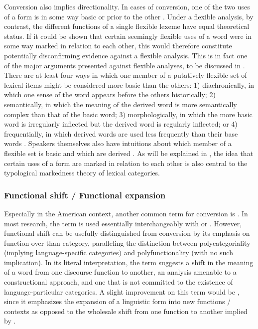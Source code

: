 Conversion also implies directionality. In cases of conversion, one of the two uses of a form is in some way basic or prior to the other \parencites[156]{Mithun2017}[5]{VapnarskyVeneziano2017a}. Under a flexible analysis, by contrast, the different functions of a single flexible lexeme have equal theoretical status. If it could be shown that certain seemingly flexible uses of a word were in some way marked in relation to each other, this would therefore constitute potentially disconfirming evidence against a flexible analysis. This is in fact one of the major arguments presented against flexible analyses, to be discussed in . There are at least four ways in which one member of a putatively flexible set of lexical items might be considered more basic than the others: 1) diachronically, in which one sense of the word appears before the others historically; 2) semantically, in which the meaning of the derived word is more semantically complex than that of the basic word; 3) morphologically, in which the more basic word is irregularly inflected but the derived word is regularly inflected; or 4) frequentially, in which derived words are used less frequently than their base words \parencite[108--111]{Plag2003}. Speakers themselves also have intuitions about which member of a flexible set is basic and which are derived \parencite[166]{Mithun2017}. As will be explained in , the idea that certain uses of a form are marked in relation to each other is also central to the typological markedness theory of lexical categories.

\subsubsection{Functional shift / Functional expansion}
\label{sec:2.3.1.8}

Especially in the American context, another common term for conversion is  \parencite{Cannon1985}. In most research, the term is used essentially interchangeably with  or . However, functional shift can be usefully distinguished from conversion by its emphasis on function over than category, paralleling the distinction between polycategoriality (implying language-specific categories) and polyfunctionality (with no such implication). In its literal interpretation, the term suggests a shift in the meaning of a word from one discourse function to another, an analysis amenable to a constructional approach, and one that is not committed to the existence of language-particular categories. A slight improvement on this term would be , since it emphasizes the expansion of a linguistic form into new functions / contexts as opposed to the wholesale shift from one function to another implied by .

